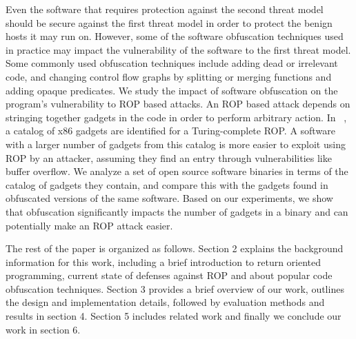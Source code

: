 Even the software that requires protection against the second threat model 
should be secure against the first threat model in order to protect the benign 
hosts it may run on. However, some of the software obfuscation techniques used 
in practice may impact the vulnerability of the software to the first threat 
model. Some commonly used obfuscation techniques include adding dead or 
irrelevant code, and changing control flow graphs by splitting or merging 
functions and adding opaque predicates. We study the impact of software 
obfuscation on the program's vulnerability to ROP based attacks. An ROP based 
attack depends on stringing together gadgets in the code in order to perform 
arbitrary action. In ~\cite{roemer2012return}, a catalog of x86 gadgets are 
identified for a Turing-complete ROP. A software with a larger number of 
gadgets from this catalog is more easier to exploit using ROP by an attacker, 
assuming they find an entry through vulnerabilities like buffer overflow. We 
analyze a set of open source software binaries in terms of the catalog of 
gadgets they contain, and compare this with the gadgets found in obfuscated 
versions of the same software. Based 
on our experiments, we show that obfuscation significantly impacts the number of gadgets in a binary and can potentially make an ROP attack easier. 

The rest of the paper is organized as follows. Section 2 explains the 
background information for this work, including a brief introduction to 
return oriented programming, current state of defenses against ROP and about 
popular code obfuscation techniques. Section 3 provides a brief overview of 
our work, outlines the design and implementation details, followed 
by evaluation methods and results in section 4. Section 5 includes related work and finally we conclude our work in section 6.
